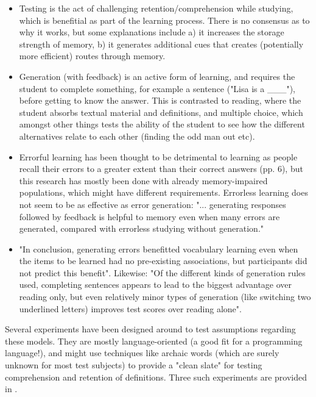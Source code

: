\begin{itemize}

\item Testing is the act of challenging retention/comprehension while studying,
  which is benefitial as part of the learning process. There is no consensus as
  to why it works, but some explanations include a) it increases the storage
  strength of memory, b) it generates additional cues that creates (potentially
  more efficient) routes through memory.\cite[p.6]{potts2014benefit}

\item Generation (with feedback) is an active form of learning, and requires the
  student to complete something, for example a sentence ("Lisa is a \_\_\_"),
  before getting to know the answer. This is contrasted to reading, where the
  student absorbs textual material and definitions, and multiple choice, which
  amongst other things tests the ability of the student to see how the different
  alternatives relate to each other (finding the odd man out etc).

\item Errorful learning has been thought to be detrimental to learning as people
  recall their errors to a greater extent than their correct answers (pp. 6),
  but this research has mostly been done with already memory-impaired
  populations, which might have different requirements. Errorless learning does
  not seem to be as effective as error generation: "... generating responses
  followed by feedback is helpful to memory even when many errors are generated,
  compared with errorless studying without
  generation."\cite[p.54]{potts2014benefit}

\item "In conclusion, generating errors benefitted vocabulary learning even when
  the items to be learned had no pre-existing associations, but participants did
  not predict this benefit"\cite[p.54]{potts2014benefit}. Likewise: "Of the
  different kinds of generation rules used, completing sentences appears to lead
  to the biggest advantage over reading only, but even relatively minor types of
  generation (like switching two underlined letters) improves test scores over
  reading alone"\cite[p.73]{benassi2014applying}.

\end{itemize}

Several experiments have been designed around to test assumptions regarding
these models. They are mostly language-oriented (a good fit for a programming
language!), and might use techniques like archaic words (which are surely
unknown for most test subjects) to provide a "clean slate" for testing
comprehension and retention of definitions. Three such experiments are provided
in \cite{potts2014benefit}.

